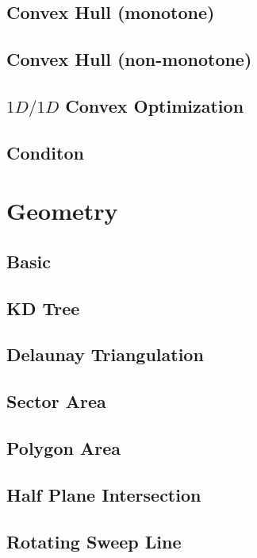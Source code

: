 \documentclass[a4paper,10pt,twocolumn,oneside]{article}
\begin{document}
\subsection{Convex Hull (monotone)}

\subsection{Convex Hull (non-monotone)}

\subsection{$1D/1D$ Convex Optimization}

\subsection{Conditon}

\section{Geometry}
\subsection{Basic}

\subsection{KD Tree}

\subsection{Delaunay Triangulation}

\subsection{Sector Area}

\subsection{Polygon Area}

\subsection{Half Plane Intersection}

\subsection{Rotating Sweep Line}

\end{document}
